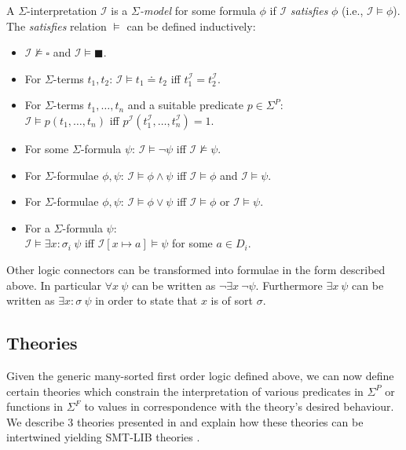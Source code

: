 \begin{definition}
A $\Sigma$-interpretation $\mathcal{I}$ is a \textit{$\Sigma$-model} for some formula $\phi$ if $\mathcal{I}$ \textit{satisfies} $\phi$ (i.e., $\mathcal{I}\vDash\phi$).\\
The \textit{satisfies} relation $\vDash$ can be defined inductively:
\begin{itemize}
    \item $\mathcal{I} \nvDash \square$ and $\mathcal{I} \vDash \blacksquare$.
    \item For $\Sigma$-terms $t_1, t_2$: 
    $\mathcal{I}\vDash t_1\doteq t_2$ iff $t_1^\mathcal{I}=t_2^\mathcal{I}$. 
    \item For $\Sigma$-terms $t_1,\dots,t_n$ and a suitable predicate $p\in\Sigma^P$:\\
    $\mathcal{I}\vDash p\left(t_1,\dots,t_n\right)$ iff $p^\mathcal{I}(t_1^\mathcal{I},\dots,t^\mathcal{I}_n)=1$. 
    \item For some $\Sigma$-formula $\psi$:
    $\mathcal{I}\vDash \neg\psi$ iff $\mathcal{I} \nvDash \psi$.
    \item For $\Sigma$-formulae $\phi, \psi$:
    $\mathcal{I}\vDash \phi\land\psi$ iff $\mathcal{I}\vDash\phi$ and $\mathcal{I}\vDash\psi$.
    \item For $\Sigma$-formulae $\phi, \psi$:
    $\mathcal{I}\vDash \phi\lor\psi$ iff $\mathcal{I}\vDash\phi$ or $\mathcal{I}\vDash\psi$. 
    \item For a $\Sigma$-formula $\psi$:\\
    $\mathcal{I}\vDash \exists x\colon\!\sigma_i\ \psi$ iff $\mathcal{I}\left[x\mapsto a\right] \vDash \psi$ for some $a\in D_i$.
\end{itemize}
\end{definition}

Other logic connectors can be transformed into formulae in the form described above. In particular $\forall x\ \psi$ can be written as $\neg\exists x\ \neg\psi$. 
Furthermore $\exists x\ \psi$ can be written as $\exists x\colon\!\sigma\ \psi$ in order to state that $x$ is of sort $\sigma$.

\subsection{Theories}
Given the generic many-sorted first order logic defined above, we can now define certain theories which constrain the interpretation of various predicates in $\Sigma^P$ or functions in $\Sigma^F$ to values in correspondence with the theory's desired behaviour. We describe 3 theories presented in \cite{Barrett-Tinelli-SMT} and explain how these theories can be intertwined yielding SMT-LIB theories \cite{BarFT-SMTLIB}.

